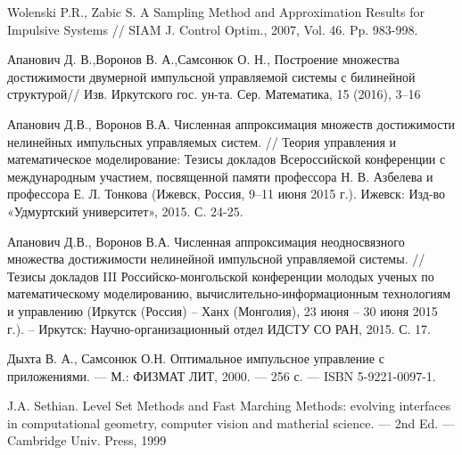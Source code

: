 \begin{thebibliography}{99}
 Wolenski P.R., Zabic S.  A Sampling Method and
  Approximation Results for Impulsive Systems // SIAM J. Control
  Optim., 2007, Vol. 46. Pp. 983-998.

 {Апанович Д. В.,Воронов В. А.,Самсонюк О. Н.},
  Построение множества достижимости двумерной импульсной управляемой
  системы с билинейной структурой// Изв. Иркутского
  гос. ун-та. Сер. Математика, 15 (2016), 3–16

 Апанович Д.В., Воронов В.А. Численная аппроксимация
  множеств достижимости нелинейных импульсных управляемых систем. //
  Теория управления и математическое моделирование: Тезисы докладов
  Всероссийской конференции с международным участием, посвященной
  памяти профессора Н. В. Азбелева и профессора Е. Л. Тонкова (Ижевск,
  Россия, 9–11 июня 2015 г.). Ижевск: Изд-во «Удмуртский университет»,
  2015. С. 24-25.

 Апанович Д.В., Воронов В.А. Численная аппроксимация
  неодносвязного множества достижимости нелинейной импульсной
  управляемой системы. //  Тезисы докладов III Российско-монгольской
  конференции молодых ученых по математическому моделированию,
  вычислительно-информационным технологиям и управлению (Иркутск
  (Россия) – Ханх (Монголия), 23 июня – 30 июня 2015 г.). – Иркутск:
  Научно-организационный отдел ИДСТУ СО РАН, 2015. С. 17.


 {Дыхта В. А., Самсонюк О.Н.} Оптимальное импульсное
  управление с приложениями. — М.: ФИЗМАТ ЛИТ, 2000. — 256 с. — ISBN
  5-9221-0097-1.

 {J.A. Sethian.} Level Set Methods and Fast Marching Methods: evolving
interfaces in computational geometry, computer vision and matherial
science. — 2nd Ed. — Cambridge Univ. Press, 1999

\end{thebibliography}


